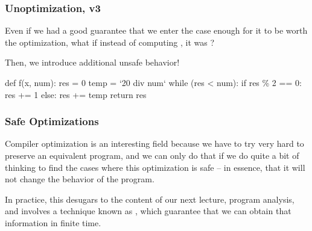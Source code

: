 \documentclass[aspectratio=169, handout]{beamer}
\begin{document}
\begin{frame}[fragile]
  \frametitle{Unoptimization, v3}

  Even if we had a good guarantee that we enter the  case
  enough for it to be worth the optimization, what if instead of computing
  , it was ?

  \vspace{\fill}

  Then, we introduce additional unsafe behavior!

  \pause
  \vspace{\fill}

  \begin{pythoncodeblock}
    def f(x, num):
      res = 0
      temp = `20 div num`
      while (res < num):
        if res \% 2 == 0:
          res += 1
        else:
          res += temp
      return res
  \end{pythoncodeblock}
\end{frame}

\begin{frame}[fragile]
  \frametitle{Safe Optimizations}

  \ptmt

  Compiler optimization is an interesting field because we have to try
  very hard to preserve an equivalent program, and we can only do that if
  we do quite a bit of thinking to find the cases where this optimization is safe --
  in essence, that it will not change the behavior of the program.

  \pause
  \vspace{\fill}


  \pause
  \vspace{\fill}

  In practice, this desugars to the content of our next lecture, program analysis,
  and involves a technique known as , which guarantee
  that we can obtain that information in finite time.
\end{frame}
\end{document}
